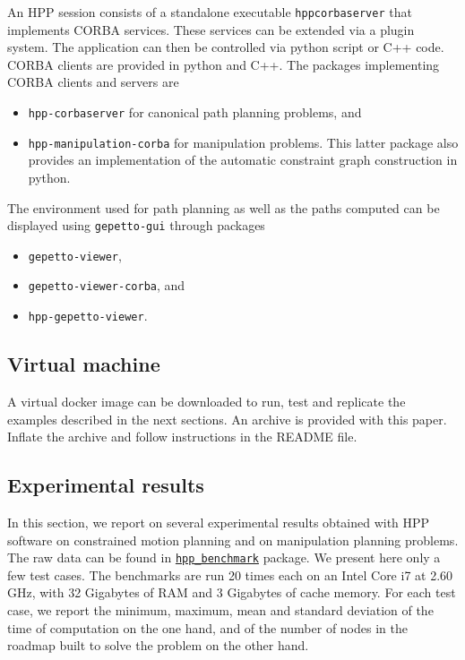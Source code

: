 An HPP session consists of a standalone executable \texttt{hppcorbaserver}
that implements CORBA services. These services can be extended via a plugin
system. The application can then be controlled via python script or C++ code.
CORBA clients are provided in python and C++. The packages implementing CORBA
clients and servers are
\begin{itemize}
\item \texttt{hpp-corbaserver} for canonical path planning problems, and
\item \texttt{hpp-manipulation-corba} for manipulation problems. This
latter package also provides an implementation of the automatic constraint graph
construction in python.
\end{itemize}
The environment used for path planning as well as the paths computed can be
displayed using \texttt{gepetto-gui} through packages
\begin{itemize}
  \item\texttt{gepetto-viewer},
  \item\texttt{gepetto-viewer-corba}, and
  \item\texttt{hpp-gepetto-viewer}.
\end{itemize}

\subsection{Virtual machine}

A virtual docker image can be downloaded to run, test and replicate the
examples described in the next sections. An archive is provided with this paper.
Inflate the archive and follow instructions in the README file.

\subsection{Experimental results}\label{sec:benchmarks}

In this section, we report on several experimental results obtained
with HPP software on constrained motion planning and on manipulation
planning problems. The raw data can be found in
\href{https://github.com/humanoid-path-planner/hpp_benchmark/tree/v4.10.0/2020-07-23}{\texttt{hpp\_benchmark}} package. We present here only a few test cases.
The benchmarks are run 20 times each on an Intel Core i7 at 2.60 GHz, with 32 Gigabytes of RAM and 3 Gigabytes of cache memory. For each test case, we report the minimum, maximum, mean and standard deviation of the time of computation on the one hand, and of the number of nodes in the roadmap built to solve the problem on the other hand.

